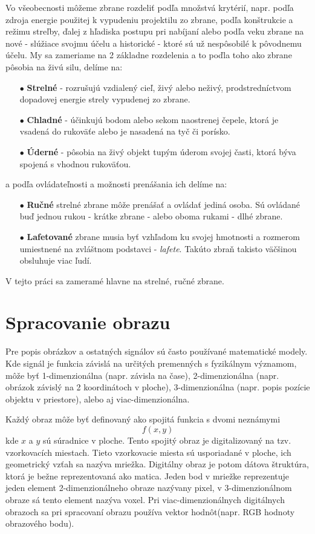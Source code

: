 Vo všeobecnosti môžeme zbrane rozdeliť podľa množstvá krytérií, napr. podľa zdroja energie použitej k vypudeniu projektilu zo zbrane,
podľa konštrukcie a režimu streľby, ďalej z hľadiska postupu pri nabíjaní alebo podľa veku zbrane na nové - slúžiace svojmu účelu a historické - ktoré sú už nespôsobilé k pôvodnemu účelu.
My sa zameriame na 2 základne rozdelenia a to poďla toho ako zbrane pôsobia na živú silu, delíme na\cite{book:StrelneZbrane}:
\begin{enumerate}
	\item[$\bullet$] \textbf{Strelné} - rozrušujú vzdialený cieľ, živý alebo neživý, prodstredníctvom dopadovej energie strely vypudenej zo zbrane.
	\item[$\bullet$] \textbf{Chladné} - účinkujú bodom alebo sekom naostrenej čepele, ktorá je vsadená do rukoväťe alebo je nasadená na tyč či porísko.
    \item[$\bullet$] \textbf{Úderné} - pôsobia na živý objekt tupým úderom svojej časti, ktorá býva spojená s vhodnou rukoväťou.
\end{enumerate}
a podľa ovládateľnosti a možnosti prenášania ich delíme na\cite{book:StrelneZbrane}:
\begin{enumerate}
	\item[$\bullet$] \textbf{Ručné} strelné zbrane môže prenášať a ovládať jediná osoba. Sú ovládané buď jednou rukou - krátke zbrane - alebo oboma rukami - dlhé zbrane.
	\item[$\bullet$] \textbf{Lafetované} zbrane musia byť vzhľadom ku svojej hmotnosti a rozmerom umiestnené na zvláštnom podstavci - \textit{lafete}. Takúto zbraň takisto väčšinou obsluhuje viac ľudí.
\end{enumerate}
V tejto práci sa zameramé hlavne na strelné, ručné zbrane.


\section{Spracovanie obrazu}
Pre popis obrázkov a ostatných signálov sú často používané matematické modely.
Kde signál je funkcia závislá na určitých premenných s fyzikálnym významom, môže byť 1-dimenzionálna (napr. závisla na čase),
2-dimenzionálna (napr. obrázok závislý na 2 koordinátoch v ploche), 3-dimenzionálna (napr. popis pozície objektu v priestore), alebo aj viac-dimenzionálna\cite{book:ImageProcessing}.

    Každý obraz môže byť definovaný ako spojitá funkcia s dvomi neznámymi $$f(x,y)$$ kde $x$ a $y$ sú súradnice v ploche.
Tento spojitý obraz je digitalizovaný na tzv. vzorkovacích miestach.
Tieto vzorkovacie miesta sú usporiadané v ploche, ich geometrický vzťah sa nazýva mriežka.
Digitálny obraz je potom dátova štruktúra, ktorá je bežne reprezentovaná ako matica.
Jeden bod v mriežke reprezentuje jeden element 2-dimenzionálneho obraze nazývany pixel, v 3-dimenzionálnom obraze sá tento element nazýva voxel\cite{book:ImageProcessing}.
Pri viac-dimenzionálnych digitálnych obrazoch sa pri spracovaní obrazu používa vektor hodnôt(napr. RGB hodnoty obrazového bodu).

